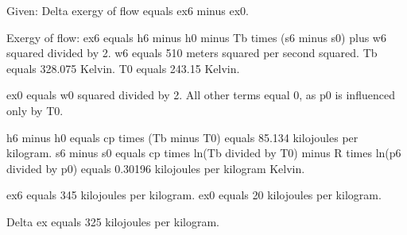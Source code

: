 Given: Delta exergy of flow equals ex6 minus ex0.  

Exergy of flow:  
ex6 equals h6 minus h0 minus Tb times (s6 minus s0) plus w6 squared divided by 2.  
w6 equals 510 meters squared per second squared.  
Tb equals 328.075 Kelvin.  
T0 equals 243.15 Kelvin.  

ex0 equals w0 squared divided by 2. All other terms equal 0, as p0 is influenced only by T0.  

h6 minus h0 equals cp times (Tb minus T0) equals 85.134 kilojoules per kilogram.  
s6 minus s0 equals cp times ln(Tb divided by T0) minus R times ln(p6 divided by p0) equals 0.30196 kilojoules per kilogram Kelvin.  

ex6 equals 345 kilojoules per kilogram.  
ex0 equals 20 kilojoules per kilogram.  

Delta ex equals 325 kilojoules per kilogram.